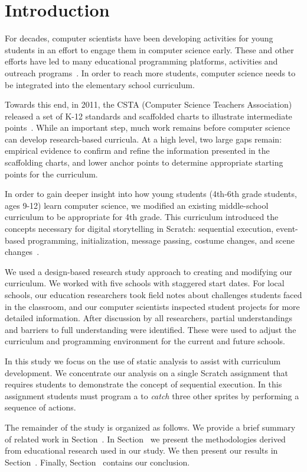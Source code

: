 \section{Introduction}
For decades, computer scientists have been developing activities for young
students in an effort to engage them in computer science early. These and other
efforts have led to many educational programming platforms, activities and
outreach programs~\cite{wayanoutpost, georgiaoutreach,
Franklin:2011:ATA:1953163.1953295, Maloney:2010:SPL:1868358.1868363,
Dann:2000:MCP:343048.343070, Hood:2005:TPL:1067445.1067454, csunplugged}. In
order to reach more students, computer science needs to be integrated into the
elementary school curriculum.

Towards this end, in 2011, the CSTA (Computer Science Teachers Association)
released a set of K-12 standards and scaffolded charts to illustrate
intermediate points~\cite{cstastandards}. While an important step, much work
remains before computer science can develop research-based curricula. At a
high level, two large gaps remain: empirical evidence to confirm and refine the
information presented in the scaffolding charts, and lower anchor points to
determine appropriate starting points for the curriculum.

In order to gain deeper insight into how young students (4th-6th grade
students, ages 9-12) learn computer science, we modified an existing
middle-school curriculum to be appropriate for 4th grade. This curriculum
introduced the concepts necessary for digital storytelling in Scratch:
sequential execution, event-based programming, initialization, message passing,
costume changes, and scene changes~\cite{Franklin:2013:SBO}.

We used a design-based research study approach to creating and modifying our
curriculum. We worked with five schools with staggered start dates. For local
schools, our education researchers took field notes about challenges students
faced in the classroom, and our computer scientists inspected student projects
for more detailed information. After discussion by all researchers, partial
understandings and barriers to full understanding were identified. These were
used to adjust the curriculum and programming environment for the current and
future schools.

In this study we focus on the use of static analysis to assist with curriculum
development. We concentrate our analysis on a single Scratch assignment that
requires students to demonstrate the concept of sequential execution. In this
assignment students must program a \net{} to \emph{catch} three other sprites
by performing a sequence of actions.

The remainder of the study is organized as follows. We provide a brief summary
of related work in Section~. In
Section~ we present the methodologies derived from
educational research used in our study. We then present our results in
Section~. Finally, Section~
contains our conclusion.
